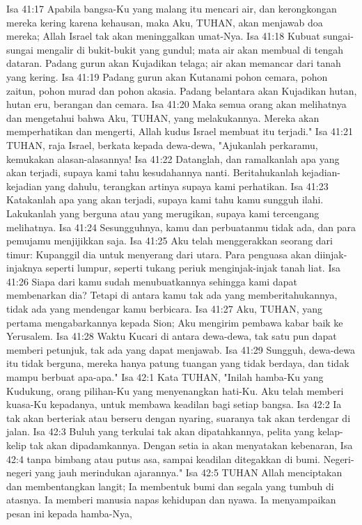 Isa 41:17  Apabila bangsa-Ku yang malang itu mencari air, dan kerongkongan mereka kering karena kehausan, maka Aku, TUHAN, akan menjawab doa mereka; Allah Israel tak akan meninggalkan umat-Nya.
Isa 41:18  Kubuat sungai-sungai mengalir di bukit-bukit yang gundul; mata air akan membual di tengah dataran. Padang gurun akan Kujadikan telaga; air akan memancar dari tanah yang kering.
Isa 41:19  Padang gurun akan Kutanami pohon cemara, pohon zaitun, pohon murad dan pohon akasia. Padang belantara akan Kujadikan hutan, hutan eru, berangan dan cemara.
Isa 41:20  Maka semua orang akan melihatnya dan mengetahui bahwa Aku, TUHAN, yang melakukannya. Mereka akan memperhatikan dan mengerti, Allah kudus Israel membuat itu terjadi."
Isa 41:21  TUHAN, raja Israel, berkata kepada dewa-dewa, "Ajukanlah perkaramu, kemukakan alasan-alasannya!
Isa 41:22  Datanglah, dan ramalkanlah apa yang akan terjadi, supaya kami tahu kesudahannya nanti. Beritahukanlah kejadian-kejadian yang dahulu, terangkan artinya supaya kami perhatikan.
Isa 41:23  Katakanlah apa yang akan terjadi, supaya kami tahu kamu sungguh ilahi. Lakukanlah yang berguna atau yang merugikan, supaya kami tercengang melihatnya.
Isa 41:24  Sesungguhnya, kamu dan perbuatanmu tidak ada, dan para pemujamu menjijikkan saja.
Isa 41:25  Aku telah menggerakkan seorang dari timur: Kupanggil dia untuk menyerang dari utara. Para penguasa akan diinjak-injaknya seperti lumpur, seperti tukang periuk menginjak-injak tanah liat.
Isa 41:26  Siapa dari kamu sudah menubuatkannya sehingga kami dapat membenarkan dia? Tetapi di antara kamu tak ada yang memberitahukannya, tidak ada yang mendengar kamu berbicara.
Isa 41:27  Aku, TUHAN, yang pertama mengabarkannya kepada Sion; Aku mengirim pembawa kabar baik ke Yerusalem.
Isa 41:28  Waktu Kucari di antara dewa-dewa, tak satu pun dapat memberi petunjuk, tak ada yang dapat menjawab.
Isa 41:29  Sungguh, dewa-dewa itu tidak berguna, mereka hanya patung tuangan yang tidak berdaya, dan tidak mampu berbuat apa-apa."
Isa 42:1  Kata TUHAN, "Inilah hamba-Ku yang Kudukung, orang pilihan-Ku yang menyenangkan hati-Ku. Aku telah memberi kuasa-Ku kepadanya, untuk membawa keadilan bagi setiap bangsa.
Isa 42:2  Ia tak akan berteriak atau berseru dengan nyaring, suaranya tak akan terdengar di jalan.
Isa 42:3  Buluh yang terkulai tak akan dipatahkannya, pelita yang kelap-kelip tak akan dipadamkannya. Dengan setia ia akan menyatakan kebenaran,
Isa 42:4  tanpa bimbang atau putus asa, sampai keadilan ditegakkan di bumi. Negeri-negeri yang jauh merindukan ajarannya."
Isa 42:5  TUHAN Allah menciptakan dan membentangkan langit; Ia membentuk bumi dan segala yang tumbuh di atasnya. Ia memberi manusia napas kehidupan dan nyawa. Ia menyampaikan pesan ini kepada hamba-Nya,
